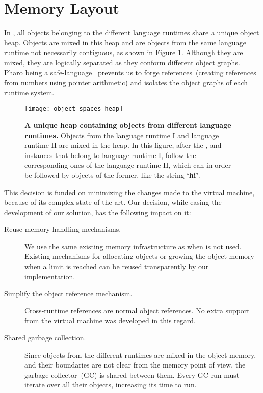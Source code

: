 
\section{Memory Layout} \label{sec:memory}

In \Vtt, all objects belonging to the different language runtimes share a unique object heap. Objects are mixed in this heap and are objects from the same language runtime not necessarily contiguous, as shown in Figure \ref{fig:heap}. Although they are mixed, they are logically separated as they conform different object graphs. Pharo being a safe-language~\cite{Hawb98a,Hawb02a} prevents us to forge references~(\ie creating references from numbers using pointer arithmetic) and isolates the object graphs of each runtime system.

\begin{figure}[ht]
\begin{center}
\texttt{[image: object\_spaces\_heap]}
\caption{\textbf{A unique heap containing objects from different language runtimes.} Objects from the language runtime I and language runtime II are mixed in the heap. In this figure, after the ,  and  instances that belong to language runtime I, follow the corresponding ones of the language runtime II, which can in order be followed by objects of the former, like the string \textbf{`hi'}. \label{fig:heap}}
\end{center}
\end{figure}

This decision is funded on minimizing the changes made to the virtual machine, because of its complex state of the art. Our decision, while easing the development of our solution, has the following impact on it:

\begin{description}
	\item[Reuse memory handling mechanisms.] We use the same existing memory infrastructure as when \Vtt is not used. Existing mechanisms for allocating objects or growing the object memory when a limit is reached can be reused transparently by our implementation. 
	\item[Simplify the object reference mechanism.] Cross-runtime references are normal object references. No extra support from the virtual machine was developed in this regard.
	\item[Shared garbage collection.] Since objects from the different runtimes are mixed in the object memory, and their boundaries are not clear from the memory point of view, the garbage collector~(GC) is shared between them. Every GC run must iterate over all their objects, increasing its time to run.
\end{description}

